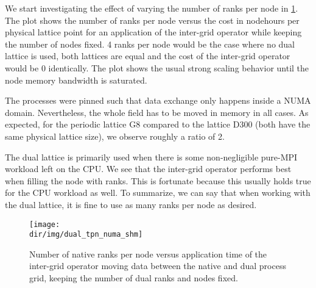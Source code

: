 We start investigating the effect of varying the number of ranks per node in \cref{fig:dual:tpn}.
The plot shows the number of ranks per node versus the cost in nodehours per physical lattice point for an application of the inter-grid operator while keeping the number of nodes fixed.
\num{4} ranks per node would be the case where no dual lattice is used, \ie both lattices are equal and the cost of the inter-grid operator would be \num{0} identically.
The plot shows the usual strong scaling behavior until the node memory bandwidth is saturated.

The processes were pinned such that data exchange only happens inside a NUMA domain.
Nevertheless, the whole field has to be moved in memory in all cases.
As expected, for the periodic lattice G8 compared to the \Cstar lattice D300 (both have the same physical lattice size), we observe roughly a ratio of \num{2}.

The dual lattice is primarily used when there is some non-negligible pure-MPI workload left on the CPU.
We see that the inter-grid operator performs best when filling the node with ranks.
This is fortunate because this usually holds true for the CPU workload as well.
To summarize, we can say that when working with the dual lattice, it is fine to use as many ranks per node as desired.
\begin{figure}
    \centering
    \texttt{[image: \\dir/img/dual\_tpn\_numa\_shm]}
    \caption{Number of native ranks per node versus application time of the inter-grid operator moving data between the native and dual process grid, keeping the number of dual ranks and nodes fixed. }
    \label{fig:dual:tpn}
\end{figure}

